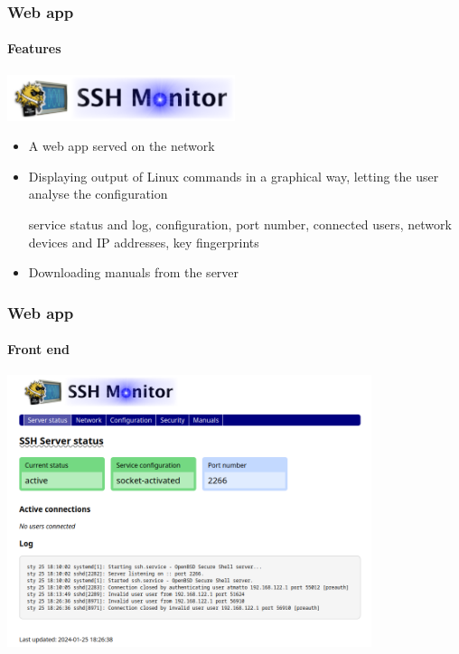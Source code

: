 \documentclass{beamer}
\begin{document}
\begin{frame}[fragile]
	\frametitle{Web app}
	\framesubtitle{Features}
	\begin{center}
		\includegraphics[width=0.5\textwidth]{sshmon.png}
	\end{center}
	\begin{itemize}
		\item A web app served on the network
		\item Displaying output of Linux commands in a graphical way, letting the user analyse the configuration
		\begin{center}
			service status and log, configuration, port number, connected users, network devices and IP addresses, key fingerprints
		\end{center}
		\item Downloading manuals from the server
	\end{itemize}
\end{frame}

\begin{frame}[fragile]
	\frametitle{Web app}
	\framesubtitle{Front end}
	\begin{center}
		\includegraphics[width=0.8\textwidth]{app.png}
	\end{center}
\end{frame}
\end{document}
